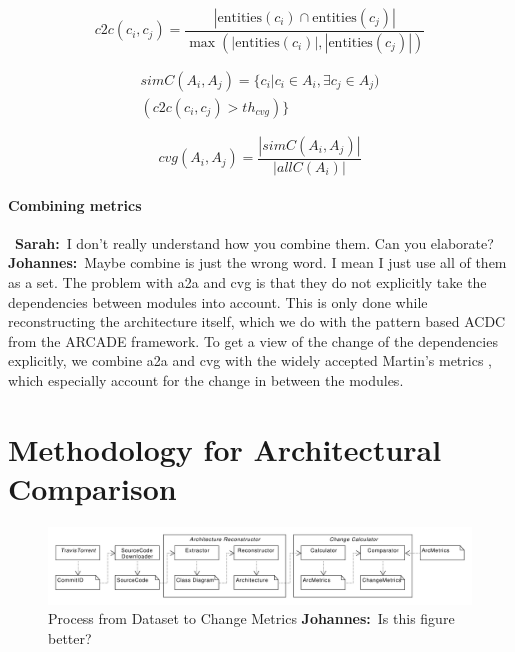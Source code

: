 \documentclass[sigplan, anonymous, review]{acmart}
\newcommand{\sn}[1]{{\color{blue}\textbf{Sarah:}~#1}}
\newcommand{\jk}[1]{{\color{violet}\textbf{Johannes:}~#1}}
\begin{document}
\begin{equation} \label{eq:c2c}
c2c(c_i, c_j) = \frac{|\text{entities}(c_i) \cap \text{entities}(c_j)|}{\max(|\text{entities}(c_i)|, |\text{entities}(c_j)|)}
\end{equation}

\begin{equation} \label{eq:simC}
\begin{split}
simC(A_i, A_j) = \{c_i | c_i \in A_i, \exists c_j \in A_j) \\ 
(c2c(c_i, c_j) > th_{cvg})\}
\end{split}
\end{equation}

\begin{equation} \label{eq:cvg}
cvg(A_i, A_j) = \frac{|simC(A_i, A_j)|}{|allC(A_i)|}
\end{equation}

\paragraph{Combining metrics} 
~\sn{I don't really understand how you combine them. Can you elaborate?} \jk{Maybe combine is just the wrong word. I mean I just use all of them as a set. }
The problem with a2a and cvg is that they do not explicitly take the dependencies between modules into account. This is only done while reconstructing the architecture itself, which we do with the pattern based ACDC from the ARCADE framework. 
To get a view of the change of the dependencies explicitly, we combine a2a and cvg with the widely accepted Martin's metrics \cite{Val-MartinsMet}, which especially account for the change in between the modules. 

\section{Methodology for Architectural Comparison}

\begin{figure}[!t]
	\centering
	\includegraphics[width=7in]{assets/combined.pdf}
	\caption{Process from Dataset to Change Metrics \jk{Is this figure better?}}
	\label{architecture}
\end{figure}
\end{document}
